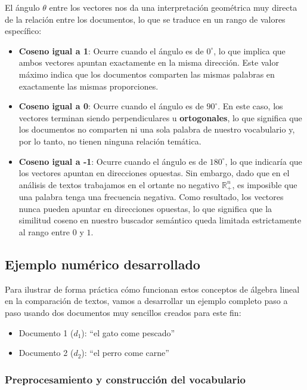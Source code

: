 \documentclass[12pt,a4paper]{article}
\begin{document}
El ángulo $\theta$ entre los vectores nos da una interpretación geométrica muy directa de la relación entre los documentos, lo que se traduce en un rango de valores específico:
\begin{itemize}
    \item \textbf{Coseno igual a 1}: Ocurre cuando el ángulo es de $0^\circ$, lo que implica que ambos vectores apuntan exactamente en la misma dirección. Este valor máximo indica que los documentos comparten las mismas palabras en exactamente las mismas proporciones.
    \item \textbf{Coseno igual a 0}: Ocurre cuando el ángulo es de $90^\circ$. En este caso, los vectores terminan siendo perpendiculares u \textbf{ortogonales}, lo que significa que los documentos no comparten ni una sola palabra de nuestro vocabulario y, por lo tanto, no tienen ninguna relación temática.
    \item \textbf{Coseno igual a -1}: Ocurre cuando el ángulo es de $180^\circ$, lo que indicaría que los vectores apuntan en direcciones opuestas. Sin embargo, dado que en el análisis de textos trabajamos en el ortante no negativo $\mathbb{R}^n_+$, es imposible que una palabra tenga una frecuencia negativa. Como resultado, los vectores nunca pueden apuntar en direcciones opuestas, lo que significa que la similitud coseno en nuestro buscador semántico queda limitada estrictamente al rango entre $0$ y $1$.
\end{itemize}

\subsection{Ejemplo numérico desarrollado}

Para ilustrar de forma práctica cómo funcionan estos conceptos de álgebra lineal en la comparación de textos, vamos a desarrollar un ejemplo completo paso a paso usando dos documentos muy sencillos creados para este fin:
\begin{itemize}
    \item Documento 1 ($d_1$): ``el gato come pescado''
    \item Documento 2 ($d_2$): ``el perro come carne''
\end{itemize}

\subsubsection{Preprocesamiento y construcción del vocabulario}
\end{document}
